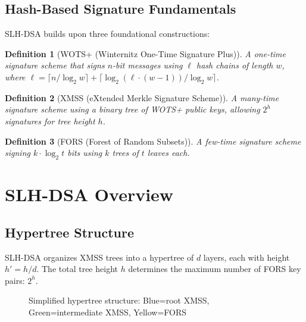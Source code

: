 \documentclass[11pt,a4paper]{article}
\newtheorem{definition}{Definition}
\begin{document}
\subsection{Hash-Based Signature Fundamentals}

SLH-DSA builds upon three foundational constructions:

\begin{definition}[WOTS+ (Winternitz One-Time Signature Plus)]
A one-time signature scheme that signs $n$-bit messages using $\ell$ hash chains of length $w$, where $\ell = \lceil n/\log_2 w \rceil + \lceil \log_2(\ell \cdot (w-1))/\log_2 w \rceil$.
\end{definition}

\begin{definition}[XMSS (eXtended Merkle Signature Scheme)]
A many-time signature scheme using a binary tree of WOTS+ public keys, allowing $2^h$ signatures for tree height $h$.
\end{definition}

\begin{definition}[FORS (Forest of Random Subsets)]
A few-time signature scheme signing $k \cdot \log_2 t$ bits using $k$ trees of $t$ leaves each.
\end{definition}

\section{SLH-DSA Overview}

\subsection{Hypertree Structure}

SLH-DSA organizes XMSS trees into a hypertree of $d$ layers, each with height $h' = h/d$. The total tree height $h$ determines the maximum number of FORS key pairs: $2^h$.

\begin{figure}[htbp]
\centering
{}
\caption{Simplified hypertree structure: Blue=root XMSS, Green=intermediate XMSS, Yellow=FORS}
\label{fig:hypertree}
\end{figure}
\end{document}
